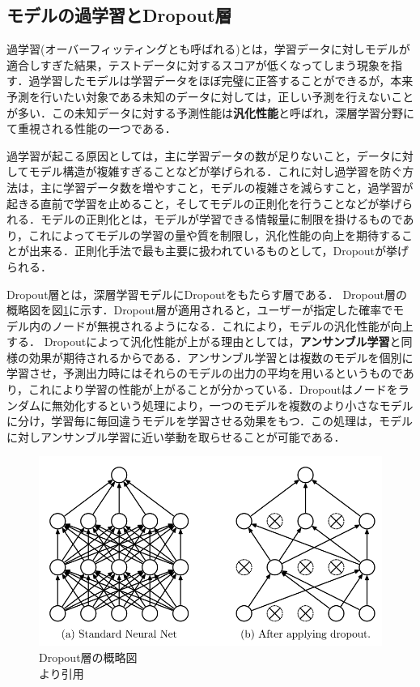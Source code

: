 \documentclass[a4j, 11pt]{jreport}
\begin{document}
\subsection{モデルの過学習とDropout層}
過学習(オーバーフィッティングとも呼ばれる)とは，学習データに対しモデルが適合しすぎた結果，テストデータに対するスコアが低くなってしまう現象を指す．過学習したモデルは学習データをほぼ完璧に正答することができるが，本来予測を行いたい対象である未知のデータに対しては，正しい予測を行えないことが多い．この未知データに対する予測性能は\textbf{汎化性能}と呼ばれ，深層学習分野にて重視される性能の一つである．

過学習が起こる原因としては，主に学習データの数が足りないこと，データに対してモデル構造が複雑すぎることなどが挙げられる．これに対し過学習を防ぐ方法は，主に学習データ数を増やすこと，モデルの複雑さを減らすこと，過学習が起きる直前で学習を止めること，そしてモデルの正則化を行うことなどが挙げられる．モデルの正則化とは，モデルが学習できる情報量に制限を掛けるものであり，これによってモデルの学習の量や質を制限し，汎化性能の向上を期待することが出来る．正則化手法で最も主要に扱われているものとして，Dropout\cite{Srivastava2014}が挙げられる．

Dropout層とは，深層学習モデルにDropoutをもたらす層である．
Dropout層の概略図を図\ref{fig:dropout}に示す．Dropout層が適用されると，ユーザーが指定した確率でモデル内のノードが無視されるようになる．これにより，モデルの汎化性能が向上する．
Dropoutによって汎化性能が上がる理由としては，\textbf{アンサンブル学習}と同様の効果が期待されるからである．アンサンブル学習とは複数のモデルを個別に学習させ，予測出力時にはそれらのモデルの出力の平均を用いるというものであり，これにより学習の性能が上がることが分かっている．Dropoutはノードをランダムに無効化するという処理により，一つのモデルを複数のより小さなモデルに分け，学習毎に毎回違うモデルを学習させる効果をもつ．この処理は，モデルに対しアンサンブル学習に近い挙動を取らせることが可能である．

\begin{figure}[H]
 \centering
 \includegraphics[width=0.8\hsize, keepaspectratio]{images/dropout.png}
 \caption{Dropout層の概略図\\\cite{Srivastava2014}より引用}
 \label{fig:dropout}
\end{figure}
\end{document}
